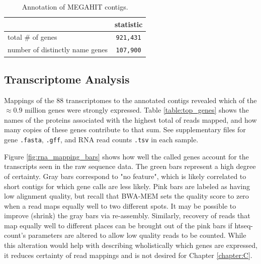 \begin{table}[H]
\centering
\begin{singlespace}
\caption[Annotation of MEGAHIT contigs]
	{Annotation of MEGAHIT contigs.}
\begin{tabular}{l | c}
        & statistic  \\
\midrule
	total \# of genes & \texttt{921,431} \\ %
	number of distinctly name genes & \texttt{107,900} \\
\end{tabular}
\label{table:annotation}
\end{singlespace}
\end{table}







\subsection{Transcriptome Analysis}

Mappings of the 88 transcriptomes to the annotated contigs revealed which of the $\approx$0.9 million genes were strongly expressed.
Table \ref{table:top_genes} shows the names of the proteins associated with the highest total of reads mapped, and how many copies of these genes contribute to that sum.
See supplementary files for gene \texttt{.fasta}, \texttt{.gff}, and RNA read counts \texttt{.tsv} in each sample.

Figure \ref{fig:rna_mapping_bars} shows how well the called genes account for the transcripts seen in the raw sequence data.
The green bars represent a high degree of certainty.
Gray bars correspond to "no feature", which is likely correlated to short contigs for which gene calls are less likely.
Pink bars are labeled as having low alignment quality, but recall that BWA-MEM sets the quality score to zero when a read maps equally well to two different spots.
It may be possible to improve (shrink) the gray bars via re-assembly.
Similarly, recovery of reads that map equally well to different places can be brought out of the pink bars if htseq-count's parameters are altered to allow low quality reads to be counted.
While this alteration would help with describing wholistically which genes are expressed, it reduces certainty of read mappings and is not desired for Chapter \ref{chapter:C}.


